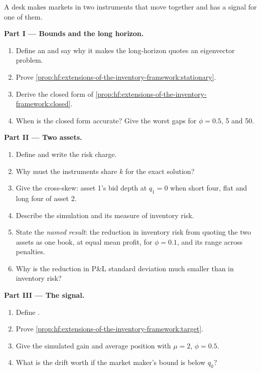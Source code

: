 \begin{problem}\label{pb:hf:extensions-of-the-inventory-framework:1}
A desk makes markets in two instruments that move together and has a signal for one of them.

\medskip\noindent\textbf{Part I --- Bounds and the long horizon.}
\begin{enumerate}
\item Define an  and say why it makes the long-horizon quotes an
eigenvector problem.
\item Prove \cref{prop:hf:extensions-of-the-inventory-framework:stationary}.
\item Derive the closed form of \cref{prop:hf:extensions-of-the-inventory-framework:closed}.
\item When is the closed form accurate? Give the worst gaps for $\phi=0.5$, 5 and 50.
\end{enumerate}

\medskip\noindent\textbf{Part II --- Two assets.}
\begin{enumerate}[resume]
\item Define  and write the risk charge.
\item Why must the instruments share $k$ for the exact solution?
\item Give the cross-skew: asset 1's bid depth at $q_1=0$ when short four, flat and long four of asset 2.
\item Describe the simulation and its measure of inventory risk.
\item State the \emph{named result}: the reduction in inventory risk from quoting the two assets as one book, at equal mean profit, for $\phi=0.1$,
and its range across penalties.
\item Why is the reduction in P\&L standard deviation much smaller than in inventory risk?
\end{enumerate}

\medskip\noindent\textbf{Part III --- The signal.}
\begin{enumerate}[resume]
\item Define .
\item Prove \cref{prop:hf:extensions-of-the-inventory-framework:target}.
\item Give the simulated gain and average position with $\mu=2$, $\phi=0.5$.
\item What is the drift worth if the market maker's bound is below $q_0$?
\end{enumerate}


\end{problem}
